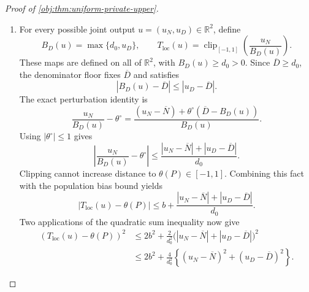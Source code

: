 \begin{proof}[Proof of \cref{obj:thm:uniform-private-upper}]
\begin{enumerate}
For binary values
\(a_{\mathrm{obs}},a'_{\mathrm{obs}},
y_{\mathrm{obs}},y'_{\mathrm{obs}}\in\{0,1\}\),
\[
\left|
(a_{\mathrm{obs}}-a'_{\mathrm{obs}})
(y_{\mathrm{obs}}-y'_{\mathrm{obs}})
\right|
\le
(a_{\mathrm{obs}}-a'_{\mathrm{obs}})^2.
\]
Taking expectations under two independent observations conditional on cell \(j\) proves
\[
|\nu_j|\le d_j.
\]
The cell conditioning is well defined by the positive cell masses under the density bounds. The occupancy weights in \cref{obj:lem:occupancy-cancellation} are nonnegative, hence
\[
|\overline N|
\le\sum_{j=1}^k w_j|\nu_j|
\le\sum_{j=1}^k w_jd_j
=\overline D,
\qquad
|\theta^\circ|\le1.
\]
Also, \cref{obj:lem:point-version} supplies
\[
\theta(P)\in[-1,1].
\]

\item
For every possible joint output \(u=(u_N,u_D)\in\mathbb R^2\), define
\[
B_D(u)=\max\{d_0,u_D\},
\qquad
T_{\mathrm{loc}}(u)
=
\operatorname{clip}_{[-1,1]}
\left(\frac{u_N}{B_D(u)}\right).
\]
These maps are defined on all of \(\mathbb R^2\), with \(B_D(u)\ge d_0>0\). Since \(\overline D\ge d_0\), the denominator floor fixes \(\overline D\) and satisfies
\[
|B_D(u)-\overline D|\le|u_D-\overline D|.
\]
The exact perturbation identity is
\[
\frac{u_N}{B_D(u)}-\theta^\circ
=
\frac{
(u_N-\overline N)+
\theta^\circ(\overline D-B_D(u))
}{B_D(u)}.
\]
Using \(|\theta^\circ|\le1\) gives
\[
\left|\frac{u_N}{B_D(u)}-\theta^\circ\right|
\le
\frac{|u_N-\overline N|+|u_D-\overline D|}{d_0}.
\]
Clipping cannot increase distance to \(\theta(P)\in[-1,1]\). Combining this fact with the population bias bound yields
\[
|T_{\mathrm{loc}}(u)-\theta(P)|
\le
b+\frac{|u_N-\overline N|+|u_D-\overline D|}{d_0}.
\]
Two applications of the quadratic sum inequality now give
\[
\begin{aligned}
(T_{\mathrm{loc}}(u)-\theta(P))^2
&\le
2b^2+
\frac{2}{d_0^2}
\bigl(|u_N-\overline N|+|u_D-\overline D|\bigr)^2\\
&\le
2b^2+\frac4{d_0^2}
\left\{
(u_N-\overline N)^2+(u_D-\overline D)^2
\right\}.
\end{aligned}
\]


\end{enumerate}
\end{proof}
